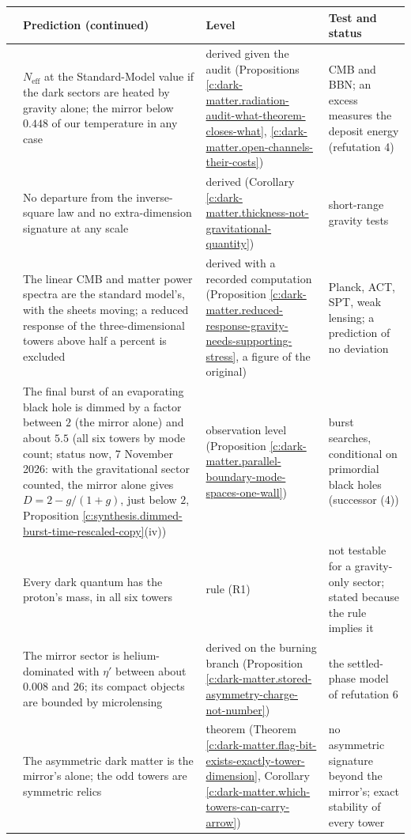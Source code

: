 \documentclass[11pt]{article}
\theoremstyle{definition}
\theoremstyle{plain}
\providecommand{\Neff}{}\renewcommand{\Neff}{N_{\mathrm{eff}}}
\begin{document}
\begin{center} \begin{tabular}{>{ \arraybackslash}p{0.5cm}>{ \arraybackslash}p{5.2cm}>{ \arraybackslash}p{2.4cm}>{ \arraybackslash}p{5.6cm}}
\toprule
& Prediction (continued) & Level & Test and status \\
\midrule
9 & $\Neff$ at the Standard-Model value if the dark sectors are heated by gravity alone; the mirror below $0.448$ of our temperature in any case & derived given the audit (Propositions \ref{c:dark-matter.radiation-audit-what-theorem-closes-what}, \ref{c:dark-matter.open-channels-their-costs}) & CMB and BBN; an excess measures the deposit energy (refutation 4) \\[2pt]
10 & No departure from the inverse-square law and no extra-dimension signature at any scale & derived (Corollary \ref{c:dark-matter.thickness-not-gravitational-quantity}) & short-range gravity tests \\[2pt]
11 & The linear CMB and matter power spectra are the standard model's, with the sheets moving; a reduced response of the three-dimensional towers above half a percent is excluded & derived with a recorded computation (Proposition \ref{c:dark-matter.reduced-response-gravity-needs-supporting-stress}, a figure of the original) & Planck, ACT, SPT, weak lensing; a prediction of no deviation \\[2pt]
12 & The final burst of an evaporating black hole is dimmed by a factor between $2$ (the mirror alone) and about $5.5$ (all six towers by mode count; status now, 7 November 2026: with the gravitational sector counted, the mirror alone gives $D = 2 - g/(1 + g)$, just below $2$, Proposition \ref{c:synthesis.dimmed-burst-time-rescaled-copy}(iv)) & observation level (Proposition \ref{c:dark-matter.parallel-boundary-mode-spaces-one-wall}) & burst searches, conditional on primordial black holes (successor (4)) \\[2pt]
13 & Every dark quantum has the proton's mass, in all six towers & rule (R1) & not testable for a gravity-only sector; stated because the rule implies it \\[2pt]
14 & The mirror sector is helium-dominated with $\eta'$ between about $0.008$ and $26$; its compact objects are bounded by microlensing & derived on the burning branch (Proposition \ref{c:dark-matter.stored-asymmetry-charge-not-number}) & the settled-phase model of refutation 6 \\[2pt]
15 & The asymmetric dark matter is the mirror's alone; the odd towers are symmetric relics & theorem (Theorem \ref{c:dark-matter.flag-bit-exists-exactly-tower-dimension}, Corollary \ref{c:dark-matter.which-towers-can-carry-arrow}) & no asymmetric signature beyond the mirror's; exact stability of every tower \\
\bottomrule
\end{tabular}
\end{center}
\end{document}

